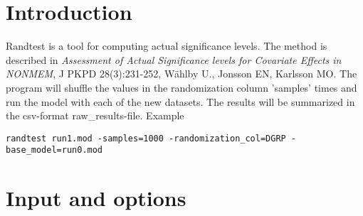 



\maketitle
\newcommand{\guidetoolname}{randtest}


\section{Introduction}

Randtest is a tool for computing actual significance levels. The method is described in
\emph{Assessment of Actual Significance levels for Covariate Effects in NONMEM}, 
J PKPD 28(3):231-252, Wählby U., Jonsson EN, Karlsson MO. 
The program will shuffle the values in the randomization 
column 'samples' times and run the model with each of the new datasets. The results will be summarized in the csv-format raw\_results-file. 
Example
\begin{verbatim}
randtest run1.mod -samples=1000 -randomization_col=DGRP -base_model=run0.mod
\end{verbatim}

\section{Input and options}
